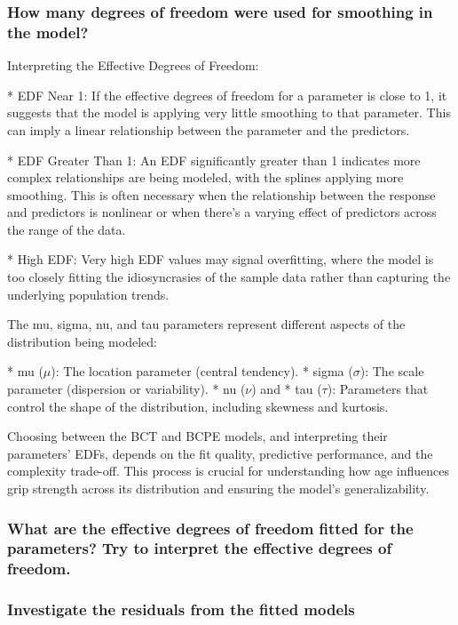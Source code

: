 \subsubsection{How many degrees of freedom were used for smoothing in the model? }

Interpreting the Effective Degrees of Freedom:

*    EDF Near 1: If the effective degrees of freedom for a parameter is close to 1, it suggests that the model is applying very little smoothing to that parameter. This can imply a linear relationship between the parameter and the predictors.

*    EDF Greater Than 1: An EDF significantly greater than 1 indicates more complex relationships are being modeled, with the splines applying more smoothing. This is often necessary when the relationship between the response and predictors is nonlinear or when there's a varying effect of predictors across the range of the data.

*    High EDF: Very high EDF values may signal overfitting, where the model is too closely fitting the idiosyncrasies of the sample data rather than capturing the underlying population trends.

The mu, sigma, nu, and tau parameters represent different aspects of the distribution being modeled:

*   mu ($\mu$): The location parameter (central tendency).
*   sigma ($\sigma$): The scale parameter (dispersion or variability).
*   nu ($\nu$) and 
*   tau ($\tau$): Parameters that control the shape of the distribution, including skewness and kurtosis.

Choosing between the BCT and BCPE models, and interpreting their parameters' EDFs, depends on the fit quality, predictive performance, and the complexity trade-off. This process is crucial for understanding how age influences grip strength across its distribution and ensuring the model's generalizability.

\subsubsection{What are the effective degrees of freedom fitted for the parameters? Try to interpret the effective degrees of freedom.}


\subsubsection{Investigate the residuals from the fitted models}

